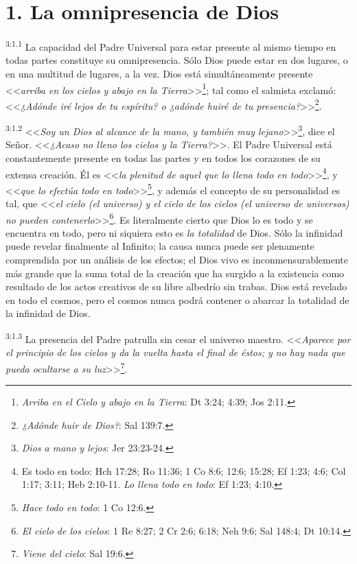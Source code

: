 \section*{1. La omnipresencia de Dios}
\par
\textsuperscript{3:1.1} La capacidad del Padre Universal para estar presente al mismo tiempo en todas partes constituye su omnipresencia. Sólo Dios puede estar en dos lugares, o en una multitud de lugares, a la vez. Dios está simultáneamente presente <<\textit{arriba en los cielos y abajo en la Tierra}>>\footnote{\textit{Arriba en el Cielo y abajo en la Tierra}: Dt 3:24; 4:39; Jos 2:11.}; tal como el salmista exclamó: <<\textit{¿Adónde iré lejos de tu espíritu? o ¿adónde huiré de tu presencia?}>>\footnote{\textit{¿Adónde huir de Dios?}: Sal 139:7.}.

\par
\textsuperscript{3:1.2} <<\textit{Soy un Dios al alcance de la mano, y también muy lejano}>>\footnote{\textit{Dios a mano y lejos}: Jer 23:23-24.}, dice el Señor. <<\textit{¿Acaso no lleno los cielos y la Tierra?}>>. El Padre Universal está constantemente presente en todas las partes y en todos los corazones de su extensa creación. Él es <<\textit{la plenitud de aquel que lo llena todo en todo}>>\footnote{Es todo en todo: Hch 17:28; Ro 11:36; 1 Co 8:6; 12:6; 15:28; Ef 1:23; 4:6; Col 1:17; 3:11; Heb 2:10-11. \textit{Lo llena todo en todo}: Ef 1:23; 4:10.}, y <<\textit{que lo efectúa todo en todo}>>\footnote{\textit{Hace todo en todo}: 1 Co 12:6.}, y además el concepto de su personalidad es tal, que <<\textit{el cielo (el universo) y el cielo de los cielos (el universo de universos) no pueden contenerlo}>>\footnote{\textit{El cielo de los cielos}: 1 Re 8:27; 2 Cr 2:6; 6:18; Neh 9:6; Sal 148:4; Dt 10:14.}. Es literalmente cierto que Dios lo es todo y se encuentra en todo, pero ni siquiera esto es \textit{la totalidad} de Dios. Sólo la infinidad puede revelar finalmente al Infinito; la causa nunca puede ser plenamente comprendida por un análisis de los efectos; el Dios vivo es inconmensurablemente más grande que la suma total de la creación que ha surgido a la existencia como resultado de los actos creativos de su libre albedrío sin trabas. Dios está revelado en todo el cosmos, pero el cosmos nunca podrá contener o abarcar la totalidad de la infinidad de Dios.

\par
\textsuperscript{3:1.3} La presencia del Padre patrulla sin cesar el universo maestro. <<\textit{Aparece por el principio de los cielos y da la vuelta hasta el final de éstos; y no hay nada que pueda ocultarse a su luz}>>\footnote{\textit{Viene del cielo}: Sal 19:6.}.

